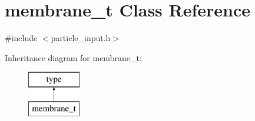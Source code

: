 \hypertarget{classmembrane__t}{}\section{membrane\+\_\+t Class Reference}
\label{classmembrane__t}


{\ttfamily \#include $<$particle\+\_\+input.\+h$>$}

Inheritance diagram for membrane\+\_\+t\+:\begin{figure}[H]
\begin{center}
\leavevmode
\includegraphics[height=2.000000cm]{classmembrane__t}
\end{center}
\end{figure}
